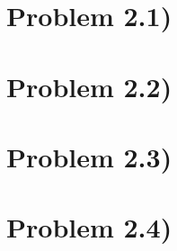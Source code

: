 \documentclass[11pt]{article} %
\begin{document}
	\section*{Problem 2.1)}
	
	\section*{Problem 2.2)}

	\section*{Problem 2.3)}

	\section*{Problem 2.4)}
	
\end{document}
